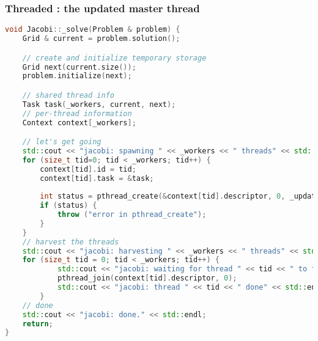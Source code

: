 \begin{frame}[fragile]
% 
  \frametitle{Threaded : the updated master thread}
%
  \begin{lstlisting}[language=c++,name=Jacobi:updated-threaded,basicstyle=\tt\bfseries\tiny]
void Jacobi::_solve(Problem & problem) {
    Grid & current = problem.solution();

    // create and initialize temporary storage
    Grid next(current.size());
    problem.initialize(next);

    // shared thread info
    Task task(_workers, current, next);
    // per-thread information
    Context context[_workers];

    // let's get going
    std::cout << "jacobi: spawning " << _workers << " threads" << std::endl;
    for (size_t tid=0; tid < _workers; tid++) {
        context[tid].id = tid;
        context[tid].task = &task;
        
        int status = pthread_create(&context[tid].descriptor, 0, _update, &context[tid]);
        if (status) {
            throw ("error in pthread_create");
        }
    }
    // harvest the threads
    std::cout << "jacobi: harvesting " << _workers << " threads" << std::endl;
    for (size_t tid = 0; tid < _workers; tid++) {
            std::cout << "jacobi: waiting for thread " << tid << " to finish" << std::endl;
            pthread_join(context[tid].descriptor, 0);
            std::cout << "jacobi: thread " << tid << " done" << std::endl;
        }
    // done
    std::cout << "jacobi: done." << std::endl;
    return;
}
  \end{lstlisting}
%
\end{frame}

